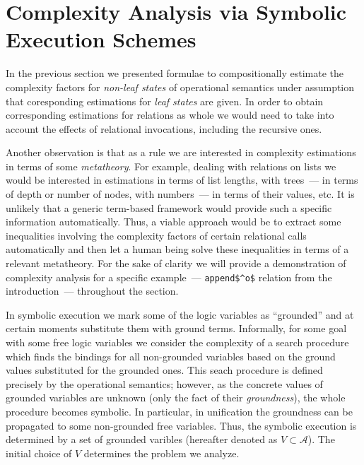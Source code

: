 \section{Complexity Analysis via Symbolic Execution Schemes}
\label{sec:symbolic}

In the previous section we presented formulae to compositionally estimate the complexity factors for
\emph{non-leaf states} of operational semantics under assumption that coresponding estimations for
\emph{leaf states} are given.
In order to obtain corresponding estimations for relations as whole we would need to take into account the effects
of relational invocations, including the recursive ones.

Another observation is that as a rule we are interested in complexity estimations in terms of some \emph{metatheory}. For
example, dealing with relations on lists we would be interested in estimations in terms of list lengths,
with trees~--- in terms of depth or number of nodes, with numbers~--- in terms of their values, etc. It is
unlikely that a generic term-based framework would provide such a specific information automatically. Thus,
a viable approach would be to extract some inequalities involving the complexity factors of certain relational
calls automatically and then let a human being solve these inequalities in terms of a relevant metatheory.
For the sake of clarity we will provide a demonstration of complexity analysis for a specific example~---
\lstinline|append$^o$| relation from the introduction~--- throughout the section.


In symbolic execution we mark some of the logic variables as ``grounded'' and at certain
moments substitute them with ground terms.
Informally, for some goal with some free logic variables we consider the complexity of a search
procedure which finds the bindings for all non-grounded variables based on the ground values
substituted for the grounded ones.
This seach procedure is defined precisely by the operational semantics; however, as the concrete
values of grounded variables are unknown (only the fact of their \emph{groundness}), the whole
procedure becomes symbolic.
In particular, in unification the groundness can be propagated to some non-grounded free variables.
Thus, the symbolic execution is determined by a set of grounded varibles (hereafter denoted
as $V\subset\mathcal A$). The initial choice of $V$ determines the problem we analyze.


